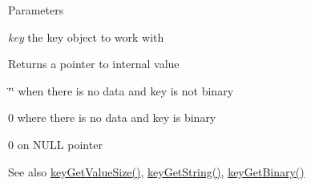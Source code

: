 \begin{DoxyParams}{Parameters}
\item[{\em key}]the key object to work with \end{DoxyParams}
\begin{DoxyReturn}{Returns}
a pointer to internal value 

\char`\"{}\char`\"{} when there is no data and key is not binary 

0 where there is no data and key is binary 

0 on NULL pointer 
\end{DoxyReturn}
\begin{DoxySeeAlso}{See also}
\hyperlink{group__keyvalue_gae326672fffb7474abfe9baf53b73217e}{keyGetValueSize()}, \hyperlink{group__keyvalue_ga41b9fac5ccddafe407fc0ae1e2eb8778}{keyGetString()}, \hyperlink{group__keyvalue_ga4c0d8a4a11174197699c231e0b5c3c84}{keyGetBinary()} 
\end{DoxySeeAlso}
